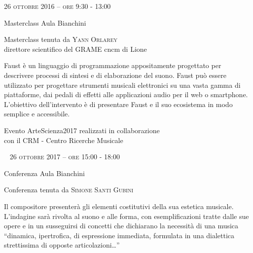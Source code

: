 
\begin{flushright}

\large{
	\scshape{
	26 ottobre 2016 -- ore 9:30 - 13:00
	}}

\medskip
	
\small{Masterclass
	\newline Aula Bianchini}

\medskip

{\fontsize{20}{20} }

\normalfont

\normalsize

\bigskip

Masterclass tenuta da \textsc{Yann Orlarey}\\{\footnotesize direttore scientifico del GRAME cncm di Lione}


\bigskip

Faust è un linguaggio di programmazione appositamente progettato per descrivere processi di sintesi e di elaborazione del suono. Faust può essere utilizzato per progettare strumenti musicali elettronici su una vasta gamma di piattaforme, dai pedali di effetti alle applicazioni audio per il web o smartphone. L'obiettivo dell'intervento è di presentare Faust e il suo ecosistema in modo semplice e accessibile.

\bigskip

\small{Evento ArteScienza2017 realizzati in collaborazione\\con il CRM - Centro Ricerche Musicale}

\vfill


~\vfill
\large{
	\scshape{
	26 ottobre 2017 -- ore 15:00 - 18:00
	}}

\medskip
	
\small{Conferenza
	\newline Aula Bianchini}

\medskip

{\fontsize{18}{18} }

\normalfont

\normalsize

\bigskip

Conferenza tenuta da \textsc{Simone Santi Gubini}

\bigskip

Il compositore presenterà gli elementi costitutivi della sua estetica musicale. L’indagine sarà rivolta al suono e alle forma, con esemplificazioni tratte dalle sue opere e in un susseguirsi di concetti che dichiarano la necessità di una musica “dinamica, ipertrofica, di espressione immediata, formulata in una dialettica strettissima di opposte articolazioni…”

\end{flushright}

\vfill